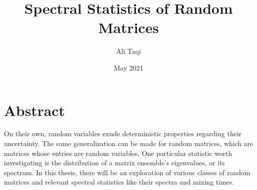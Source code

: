 \documentclass[12pt,twoside]{reedthesis}
\title{Spectral Statistics of Random Matrices}
\author{Ali Taqi}
\date{May 2021}
\begin{document}
  \maketitle
  \frontmatter %
  \pagestyle{empty} %


	
% 
	
    \tableofcontents



    \chapter*{Abstract}
	On their own, random variables exude deterministic properties regarding their uncertainty. The same generalization can be made for random matrices, which are matrices whose entries are random variables. One particular statistic worth investigating is the distribution of a matrix ensemble's eigenvalues, or its spectrum. In this thesis, there will be an exploration of various classes of random matrices and relevant spectral statistics like their spectra and mixing times.
	
\end{document}
